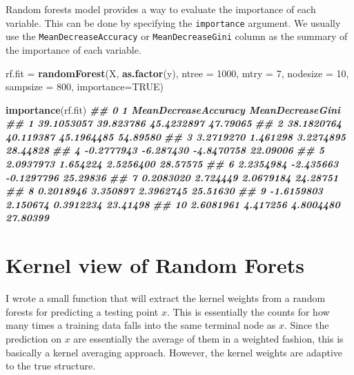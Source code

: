 \documentclass[
]{book}
\newenvironment{Shaded}{\begin{snugshade}}{\end{snugshade}}
\newcommand{\AttributeTok}[1]{\textcolor[rgb]{0.13,0.29,0.53}{#1}}
\newcommand{\ConstantTok}[1]{\textcolor[rgb]{0.56,0.35,0.01}{#1}}
\newcommand{\DecValTok}[1]{\textcolor[rgb]{0.00,0.00,0.81}{#1}}
\newcommand{\DocumentationTok}[1]{\textcolor[rgb]{0.56,0.35,0.01}{\textbf{\textit{#1}}}}
\newcommand{\FunctionTok}[1]{\textcolor[rgb]{0.13,0.29,0.53}{\textbf{#1}}}
\newcommand{\NormalTok}[1]{#1}
\newcommand{\OtherTok}[1]{\textcolor[rgb]{0.56,0.35,0.01}{#1}}
\theoremstyle{definition}
\theoremstyle{definition}
\theoremstyle{definition}
\theoremstyle{definition}
\theoremstyle{remark}
\begin{document}
Random forests model provides a way to evaluate the importance of each variable. This can be done by specifying the \texttt{importance} argument. We usually use the \texttt{MeanDecreaseAccuracy} or \texttt{MeanDecreaseGini} column as the summary of the importance of each variable.

\begin{Shaded}
\begin{Highlighting}[]
\NormalTok{  rf.fit }\OtherTok{=} \FunctionTok{randomForest}\NormalTok{(X, }\FunctionTok{as.factor}\NormalTok{(y), }\AttributeTok{ntree =} \DecValTok{1000}\NormalTok{, }
                        \AttributeTok{mtry =} \DecValTok{7}\NormalTok{, }\AttributeTok{nodesize =} \DecValTok{10}\NormalTok{, }\AttributeTok{sampsize =} \DecValTok{800}\NormalTok{,}
                        \AttributeTok{importance=}\ConstantTok{TRUE}\NormalTok{)}

  \FunctionTok{importance}\NormalTok{(rf.fit)}
\DocumentationTok{\#\#             0         1 MeanDecreaseAccuracy MeanDecreaseGini}
\DocumentationTok{\#\# 1  39.1053057 39.823786           45.4232897         47.79065}
\DocumentationTok{\#\# 2  38.1820764 40.119387           45.1964485         54.89580}
\DocumentationTok{\#\# 3   3.2719270  1.461298            3.2274895         28.44828}
\DocumentationTok{\#\# 4  {-}0.2777943 {-}6.287430           {-}4.8470758         22.09006}
\DocumentationTok{\#\# 5   2.0937973  1.654224            2.5256400         28.57575}
\DocumentationTok{\#\# 6   2.2354984 {-}2.435663           {-}0.1297796         25.29836}
\DocumentationTok{\#\# 7   0.2083020  2.724449            2.0679184         24.28751}
\DocumentationTok{\#\# 8   0.2018946  3.350897            2.3962745         25.51630}
\DocumentationTok{\#\# 9  {-}1.6159803  2.150674            0.3912234         23.41498}
\DocumentationTok{\#\# 10  2.6081961  4.417256            4.8004480         27.80399}
\end{Highlighting}
\end{Shaded}

\hypertarget{kernel-view-of-random-forets}{%
\section{Kernel view of Random Forets}\label{kernel-view-of-random-forets}}

I wrote a small function that will extract the kernel weights from a random forests for predicting a testing point \(x\). This is essentially the counts for how many times a training data falls into the same terminal node as \(x\). Since the prediction on \(x\) are essentially the average of them in a weighted fashion, this is basically a kernel averaging approach. However, the kernel weights are adaptive to the true structure.
\end{document}

